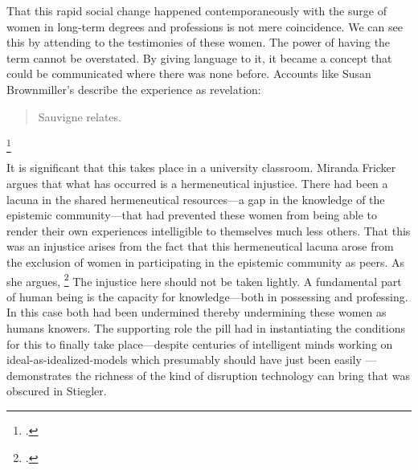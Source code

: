 \documentclass[letterpaper,notitlepage,12pt]{article}
\begin{document}
That this rapid social change happened contemporaneously with the surge of women
in long-term degrees and professions is not mere coincidence.
We can see this by attending to the testimonies of these women.
The power of having the term  cannot be overstated.
By giving language to it, it became a concept that could be communicated where
there was none before.
Accounts like Susan Brownmiller's describe the experience as revelation:
\blockquote{ Sauvigne relates.
  }\footcite[p. 281]{brownmiller_our_1999}

It is significant that this takes place in a university classroom. Miranda
Fricker argues that what has occurred is a hermeneutical injustice.
There had been a lacuna in the shared hermeneutical resources---a gap in the
knowledge of the epistemic community---that had prevented these women from
being able to render their own experiences intelligible to themselves much less
others.
That this was an injustice arises from the fact that this hermeneutical lacuna
arose from the exclusion of women in participating in the epistemic community as
peers.
As she argues, \footcite[p. 132]{fricker_epistemic_2011}
The injustice here should not be taken lightly.
A fundamental part of human being is the capacity for knowledge---both in
possessing and professing.
In this case both had been undermined thereby undermining these women as humans
 knowers.
The supporting role the pill had in instantiating the conditions for this to
finally take place---despite centuries of intelligent minds working on
ideal-as-idealized-models which presumably should have just been easily
---demonstrates the richness of the kind of disruption
technology can bring that was obscured in Stiegler.
\end{document}

